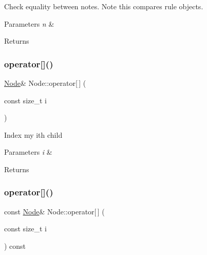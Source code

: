 Check equality between notes. Note this compares rule objects. 
\begin{DoxyParams}{Parameters}
{\em n} & \\
\hline
\end{DoxyParams}
\begin{DoxyReturn}{Returns}

\end{DoxyReturn}
\mbox{\label{class_node_a0b89084e2c7416379edb7c537edcc8f2}} 
\subsubsection{\texorpdfstring{operator[]()}{operator[]()}\hspace{0.1cm}{\footnotesize\ttfamily [1/2]}}
{\footnotesize\ttfamily \hyperlink{class_node}{Node}\& Node\+::operator\mbox{[}$\,$\mbox{]} (\begin{DoxyParamCaption}\item[{const size\+\_\+t}]{i }\end{DoxyParamCaption})\hspace{0.3cm}{\ttfamily [inline]}}

Index my i\textquotesingle{}th child 
\begin{DoxyParams}{Parameters}
{\em i} & \\
\hline
\end{DoxyParams}
\begin{DoxyReturn}{Returns}

\end{DoxyReturn}
\mbox{\label{class_node_a8bdfdaa5eb291ae5fb417f45fb8a3633}} 
\subsubsection{\texorpdfstring{operator[]()}{operator[]()}\hspace{0.1cm}{\footnotesize\ttfamily [2/2]}}
{\footnotesize\ttfamily const \hyperlink{class_node}{Node}\& Node\+::operator\mbox{[}$\,$\mbox{]} (\begin{DoxyParamCaption}\item[{const size\+\_\+t}]{i }\end{DoxyParamCaption}) const\hspace{0.3cm}{\ttfamily [inline]}}


